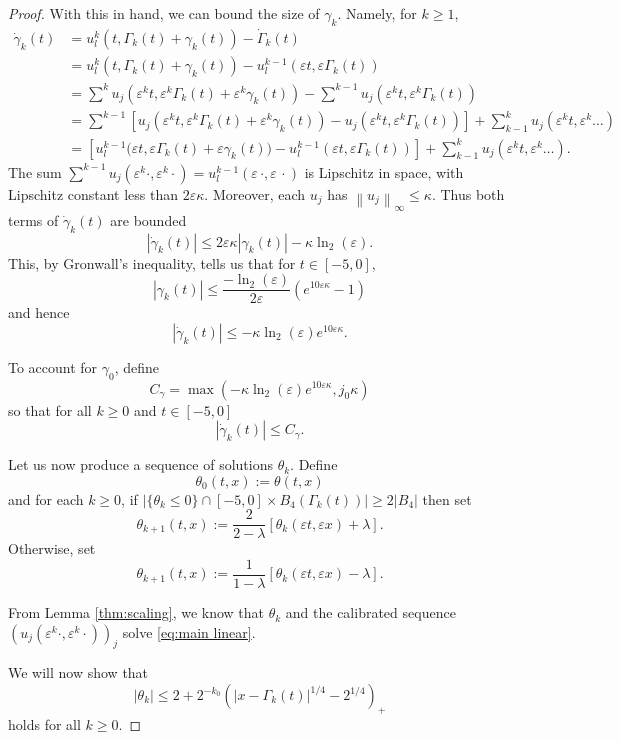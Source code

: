 \documentclass[11pt]{amsart}
\theoremstyle{remark}
\theoremstyle{definition}
\newcommand{\eps}{\varepsilon}
\newcommand{\norm}[1]{\left\lVert#1\right\rVert}
\newcommand{\paren}[1]{\left( #1 \right)}
\newcommand{\bracket}[1]{\left[ #1 \right]}
\newcommand{\ulow}{u_l}
\newcommand{\ulowth}[1]{\ulow^{#1}}
\begin{document}
\begin{proof}
With this in hand, we can bound the size of $\gamma_k$.  Namely, for $k \geq 1$, 
\begin{align*}
\dot{\gamma}_k(t) &= \ulowth{k}(t, \Gamma_k(t) + \gamma_k(t)) - \dot{\Gamma}_k(t)
\\ &= \ulowth{k}(t, \Gamma_k(t) + \gamma_k(t)) - \ulowth{k-1}(\eps t, \eps \Gamma_k(t))
\\ &= \sum^k u_j(\eps^k t, \eps^k \Gamma_k(t) + \eps^k \gamma_k(t)) - \sum^{k-1} u_j(\eps^k t, \eps^k \Gamma_k(t))
\\ &= \sum^{k-1} \bracket{u_j(\eps^k t, \eps^k \Gamma_k(t)+\eps^k \gamma_k(t)) - u_j(\eps^k t, \eps^k \Gamma_k(t))} + \sum_{k-1}^k u_j(\eps^k t, \eps^k \ldots)
\\ &= \bracket{\ulowth{k-1}\big(\eps t, \eps \Gamma_k(t)+\eps \gamma_k(t)\big) - \ulowth{k-1}(\eps t, \eps \Gamma_k(t))} + \sum_{k-1}^k u_j(\eps^k t, \eps^k \ldots).
\end{align*}
The sum $\sum^{k-1} u_j(\eps^k \cdot, \eps^k \cdot) = \ulowth{k-1}(\eps \, \cdot, \eps \, \cdot)$ is Lipschitz in space, with Lipschitz constant less than $2 \eps \kappa$.  Moreover, each $u_j$ has $\norm{u_j}_\infty \leq \kappa$.  Thus both terms of $\dot{\gamma}_k(t)$ are bounded
\[ |\dot{\gamma}_k(t)| \leq 2 \eps \kappa |\gamma_k(t)| - \kappa \ln_2(\eps). \]
This, by Gronwall's inequality, tells us that for $t \in [-5,0]$,
\[ |\gamma_k(t)| \leq \frac{-\ln_2(\eps)}{2 \eps} \paren{ e^{10 \eps \kappa} - 1} \]
and hence
\[ |\dot{\gamma}_k(t)| \leq -\kappa \ln_2(\eps) e^{10\eps \kappa}. \]

To account for $\gamma_0$, define
\[ C_\gamma = \max\paren{ - \kappa \ln_2(\eps) e^{10\eps\kappa}, j_0 \kappa} \]
so that for all $k \geq 0$ and $t \in [-5,0]$
\[ |\dot{\gamma}_k(t)| \leq C_\gamma. \]

Let us now produce a sequence of solutions $\theta_k$.  Define
\[ \theta_0(t,x) := \theta(t,x) \]
and for each $k \geq 0$, if $|\{\theta_k \leq 0\} \cap [-5,0]\times B_4(\Gamma_k(t))| \geq 2|B_4|$ then set
\[ \theta_{k+1}(t,x) := \frac{2}{2-\lambda} \bracket{\theta_k(\eps t, \eps x) + \lambda}. \]
Otherwise, set
\[ \theta_{k+1}(t,x) := \frac{1}{1-\lambda} \bracket{\theta_k(\eps t, \eps x) - \lambda}. \]

From Lemma \ref{thm:scaling}, we know that $\theta_k$ and the calibrated sequence $(u_j(\eps^k \cdot, \eps^k \cdot))_j$ solve \eqref{eq:main linear}.  

We will now show that
\begin{equation}\label{thetak below the barrier}
|\theta_k| \leq 2 + 2^{-k_0} \paren{|x-\Gamma_k(t)|^{1/4} - 2^{1/4}}_+
\end{equation}
holds for all $k \geq 0$.  


\end{proof}
\end{document}
